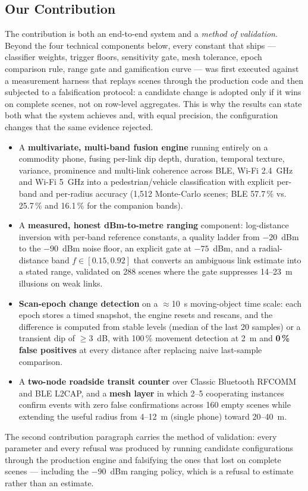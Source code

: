 \documentclass[journal,10pt]{IEEEtran}
\begin{document}
\subsection{Our Contribution}
The contribution is both an end-to-end system and a \emph{method of validation}.
Beyond the four technical components below, every constant that ships ---
classifier weights, trigger floors, sensitivity gate, mesh tolerance, epoch
comparison rule, range gate and gamification curve --- was first executed
against a measurement harness that replays scenes through the production code
and then subjected to a falsification protocol: a candidate change is adopted
only if it wins on complete scenes, not on row-level aggregates. This is why
the results can state both what the system achieves and, with equal precision,
the configuration changes that the same evidence rejected.
\begin{itemize}
  \item A \textbf{multivariate, multi-band fusion engine} running entirely on a
  commodity phone, fusing per-link dip depth, duration, temporal texture,
  variance, prominence and multi-link coherence across BLE, Wi-Fi 2.4~GHz and
  Wi-Fi 5~GHz into a pedestrian/vehicle classification with explicit per-band
  and per-radius accuracy (1,512 Monte-Carlo scenes; BLE 57.7\,\% vs. 25.7\,\%
  and 16.1\,\% for the companion bands).
  \item A \textbf{measured, honest dBm-to-metre ranging} component: log-distance
  inversion with per-band reference constants, a quality ladder from
  $-20$~dBm to the $-90$~dBm noise floor, an explicit gate at $-75$~dBm, and a
  radial-distance band $f \in [0.15, 0.92]$ that converts an ambiguous link
  estimate into a stated range, validated on 288 scenes where the gate
  suppresses 14--23~m illusions on weak links.
  \item \textbf{Scan-epoch change detection} on a $\approx$10~s moving-object
  time scale: each epoch stores a timed snapshot, the engine resets and
  rescans, and the difference is computed from stable levels (median of the
  last 20 samples) or a transient dip of $\geq 3$~dB, with 100\,\% movement
  detection at 2~m and \textbf{0\,\% false positives} at every distance after
  replacing naive last-sample comparison.
  \item A \textbf{two-node roadside transit counter} over Classic Bluetooth
  RFCOMM and BLE L2CAP, and a \textbf{mesh layer} in which 2--5 cooperating
  instances confirm events with zero false confirmations across 160 empty
  scenes while extending the useful radius from 4--12~m (single phone) toward
  20--40~m.
\end{itemize}
The second contribution paragraph carries the method of validation: every
parameter and every refusal was produced by running candidate configurations
through the production engine and falsifying the ones that lost on complete
scenes --- including the $-90$~dBm ranging policy, which is a refusal to
estimate rather than an estimate.
\end{document}
